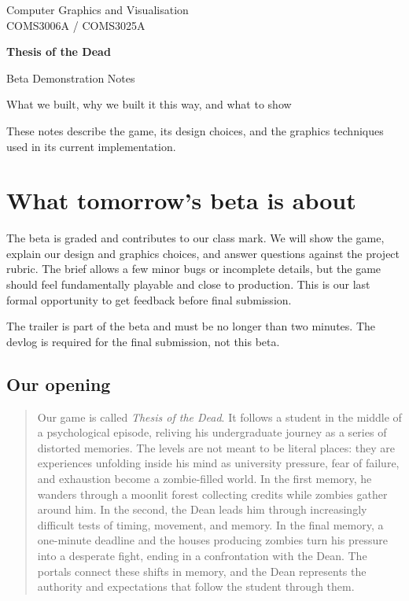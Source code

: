 \documentclass[11pt,a4paper]{article}
\newcommand{\say}[1]{\begin{quote}\small\color{ink}#1\end{quote}}
\begin{document}
\begin{titlepage}
  \centering
  \vspace*{20mm}
  {\Large Computer Graphics and Visualisation\\[3pt]
  COMS3006A / COMS3025A\par}
  \vspace{18mm}
  {\Huge\bfseries\color{ink} Thesis of the Dead\par}
  \vspace{5mm}
  {\LARGE Beta Demonstration Notes\par}
  \vspace{8mm}
  {\large What we built, why we built it this way, and what to show\par}
  \vfill
  \vspace{15mm}
  \begin{minipage}{0.86\textwidth}\centering\small
    These notes describe the game, its design choices, and the graphics techniques used in its current implementation.
  \end{minipage}
\end{titlepage}

\tableofcontents
\newpage

\section{What tomorrow's beta is about}

The beta is graded and contributes to our class mark. We will show the game, explain our design and graphics choices, and answer questions against the project rubric. The brief allows a few minor bugs or incomplete details, but the game should feel fundamentally playable and close to production. This is our last formal opportunity to get feedback before final submission.

The trailer is part of the beta and must be no longer than two minutes. The devlog is required for the final submission, not this beta.

\subsection{Our opening}
\say{Our game is called \emph{Thesis of the Dead}. It follows a student in the middle of a psychological episode, reliving his undergraduate journey as a series of distorted memories. The levels are not meant to be literal places: they are experiences unfolding inside his mind as university pressure, fear of failure, and exhaustion become a zombie-filled world. In the first memory, he wanders through a moonlit forest collecting credits while zombies gather around him. In the second, the Dean leads him through increasingly difficult tests of timing, movement, and memory. In the final memory, a one-minute deadline and the houses producing zombies turn his pressure into a desperate fight, ending in a confrontation with the Dean. The portals connect these shifts in memory, and the Dean represents the authority and expectations that follow the student through them.}
\end{document}
